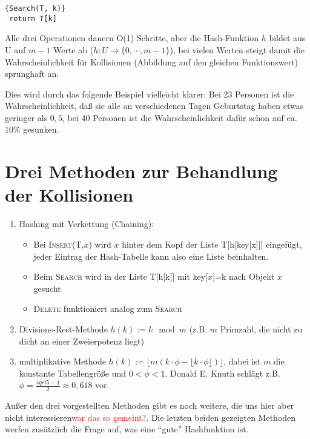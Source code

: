 \documentclass[ngerman,draft,parskip=half*,twoside]{scrreprt}
\theoremstyle{break}
\begin{document}
\begin{Algorithmus}[H]
\begin{lstlisting}[frame=tlrb, mathescape=true, title=\textsc{Search\textnormal{(T, k)}},gobble=1]{Search(T, k)}
 return T[k]
\end{lstlisting}
\end{Algorithmus} 

Alle drei Operationen dauern O(1) Schritte, aber
die Hash-Funktion $h$ bildet aus U auf $m-1$ Werte ab ($h: U \rightarrow \{0, \cdots, m-1\}$), bei vielen Werten steigt
damit die Wahrscheinlichkeit für Kollisionen (Abbildung auf den gleichen Funktionswert) sprunghaft an. 

Dies wird durch das folgende Beispiel vielleicht klarer: Bei 23 Personen
ist die Wahrscheinlichkeit, daß sie alle an verschiedenen Tagen Geburtstag haben etwas geringer als $0,5$, bei 40
Personen ist die Wahrscheinlichkeit dafür schon auf ca. 10\% gesunken.

\section{Drei Methoden zur Behandlung der Kollisionen}
\begin{enumerate}
\item Hashing mit Verkettung (Chaining): 
  \begin{itemize}
  \item Bei \textsc{Insert}(T,$x$) wird $x$ hinter dem Kopf der Liste T[h[key[x]]]
    eingefügt, jeder Eintrag der Hash-Tabelle kann also eine Liste beinhalten. 
  \item Beim \textsc{Search} wird in der Liste T[h[k]] mit key[$x$]=k nach Objekt $x$ gesucht
  \item \textsc{Delete} funktioniert analog zum \textsc{Search}
  \end{itemize}
\item Divisions-Rest-Methode $h(k):=k \mod m$ (z.B. $m$ Primzahl, die nicht zu dicht an einer Zweierpotenz liegt)  
\item multiplikative Methode $h(k):=\lfloor m(k \cdot \phi -\lfloor k \cdot \phi \rfloor) \rfloor$, dabei ist $m$ die
konstante Tabellengröße und $0 < \phi <1$. Donald E. Knuth schlägt z.B. $\phi=\frac{sqrt{5}-1}{2} \approx 0,618$ vor.
\end{enumerate} 
Außer den drei vorgestellten Methoden gibt es noch weitere, die uns hier aber nicht interessieren\textcolor{red}{war
das so gemeint?}. Die letzten beiden gezeigten Methoden werfen zusätzlich die Frage auf, was eine
"`gute"' Hashfunktion ist.
\end{document}
